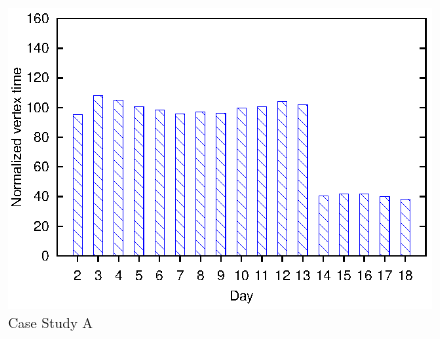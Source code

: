 \begin{figure}[ht]
\includegraphics{graphs/normalizedTimesA}
\caption{Case Study A \label{fig:CaseStudyA}}
\end{figure}

